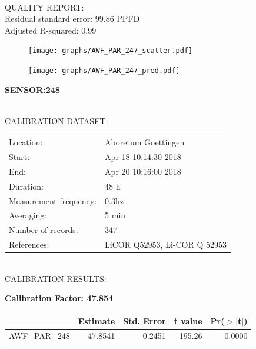 \documentclass[oneside]{report}
\begin{document}
\hrulefill\\
QUALITY REPORT:\\
Residual standard error: 99.86 PPFD\\
Adjusted R-squared: 0.99



\begin{figure}[H]
  \centering
  \texttt{[image: graphs/AWF\_PAR\_247\_scatter.pdf]}
\end{figure}




\begin{figure}[H]
  \centering
  \texttt{[image: graphs/AWF\_PAR\_247\_pred.pdf]}
\end{figure}

\pagebreak


\begin{center}
\large{\textbf{SENSOR:248}}\\
\end{center}

\hrulefill\\
CALIBRATION DATASET:\\
\begin{table}[h!]
  \centering
  \label{tab:table1}
  \begin{tabular}{ll}
    Location: & Aboretum Goettingen\\ 
    
    
    Start:  & Apr 18 10:14:30 2018 \\
    End:   & Apr 20 10:16:00 2018\\ 
    Duration: & 48 h\\
    Measurement frequency: & 0.3hz\\
    Averaging:  &5 min\\
    Number of records: & 347 \\
    References: & LiCOR Q52953, Li-COR Q 52953 \\
  \end{tabular}
\end{table}

\hrulefill\\
CALIBRATION RESULTS:\\


\begin{center}
\textbf{\large{Calibration Factor: 47.854}}\\
\end{center}
\begin{table}[ht]
\centering
\begin{tabular}{rrrrr}
  \hline
 & Estimate & Std. Error & t value & Pr($>$$|$t$|$) \\ 
  \hline
AWF\_PAR\_248 & 47.8541 & 0.2451 & 195.26 & 0.0000 \\ 
   \hline
\end{tabular}
\end{table}
\end{document}
